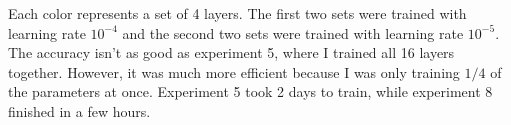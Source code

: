 \documentclass{article}
\begin{document}
Each color represents a set of 4 layers. The first two sets were trained with
learning rate \( 10^{-4} \) and the second two sets were trained with learning
rate \( 10^{-5} \). The accuracy isn't as good as experiment 5, where I trained
all 16 layers together. However, it was much more efficient because I was only
training \( 1 / 4 \) of the parameters at once. Experiment 5 took 2 days to
train, while experiment 8 finished in a few hours.
\end{document}
